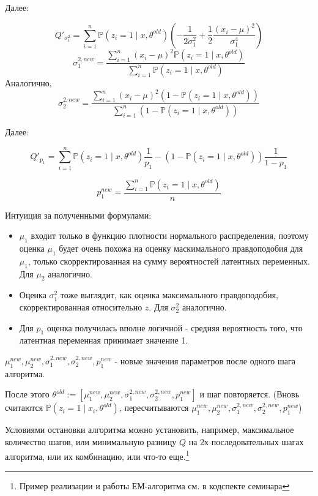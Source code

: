 \documentclass[12pt,letterpaper]{article}
\begin{document}
{\begin{enumerate}
{            Далее:
            
            $$Q'_{\sigma_1^2} = \sum\limits_{i=1}^{n} \mathbb{P}(z_i = 1 \mid x, \theta^{old}) \left(-\dfrac{1}{2\sigma^2_1} + \dfrac{1}{2}\dfrac{(x_i - \mu)^2}{\sigma_1^4}\right)$$
            $$\sigma_1^{2, new} = \dfrac{\sum\limits_{i=1}^{n} (x_i - \mu)^2 \mathbb{P}(z_i = 1 \mid x, \theta^{old})}{\sum\limits_{i=1}^{n} \mathbb{P}(z_i = 1 \mid x, \theta^{old})}$$
            Аналогично,
            $$\sigma_2^{2, new} = \dfrac{\sum\limits_{i=1}^{n} (x_i - \mu)^2 (1-\mathbb{P}(z_i = 1 \mid x, \theta^{old}))}{\sum\limits_{i=1}^{n} (1-\mathbb{P}(z_i = 1 \mid x, \theta^{old}))}$$
            
            Далее:
            
            $$Q'_{p_1} = \sum\limits_{i=1}^{n} \mathbb{P}(z_i = 1 \mid x, \theta^{old}) \dfrac{1}{p_1} - (1 - \mathbb{P}(z_i = 1 \mid x, \theta^{old})) \dfrac{1}{1 - p_1}$$
            
            $$p_1^{new} = \dfrac{\sum\limits_{i=1}^{n} \mathbb{P}(z_i = 1 \mid x, \theta^{old})}{n}$$
            
            Интуиция за полученными формулами: 
            \begin{itemize}
                \item  $\mu_1$ входит только в функцию плотности нормального распределения, поэтому оценка $\mu_1$ будет очень похожа на оценку маскимального правдоподобия для $\mu_1$, только скорректированная на сумму вероятностей латентных переменных. Для $\mu_2$ аналогично.
            
                \item Оценка $\sigma_1^2$ тоже выглядит, как оценка максимального правдоподобия, скорректированная относительно $z$. Для $\sigma_2^2$ аналогично.
                
                \item Для $p_1$ оценка получилась вполне логичной - средняя вероятность того, что латентная переменная принимает значение 1.
            \end{itemize}
            $\mu_1^{new}, \mu_2^{new}, \sigma_1^{2,new}, \sigma_2^{2,new}, p_1^{new}$ - новые значения параметров после одного шага алгоритма.
            
            После этого $\theta^{old} := [\mu_1^{new}, \mu_2^{new}, \sigma_1^{2,new}, \sigma_2^{2,new}, p_1^{new}]$ и шаг повторяется. (Вновь считаются $\mathbb{P}(z_i = 1 \mid x_i, \theta^{old})$, пересчитываются $\mu_1^{new}, \mu_2^{new}, \sigma_1^{2,new}, \sigma_2^{2,new}, p_1^{new}$)
            
            Условиями остановки алгоритма можно установить, например, максимальное количество шагов, или минимальную разницу  $Q$ на 2х последовательных шагах алгоритма, или их комбинацию, или что-то еще.\footnote{Пример реализации и работы ЕМ-алгоритма см. в кодспекте семинара}
        }
    \end{enumerate}
}
\end{document}
